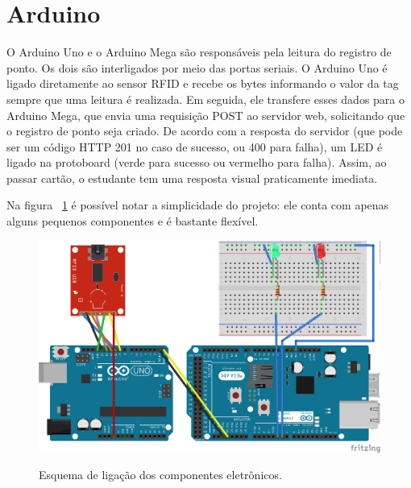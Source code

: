 \section{Arduino}

O Arduino Uno e o Arduino Mega são responsáveis pela leitura do registro de ponto. Os dois são interligados por meio das portas seriais. O Arduino Uno é ligado diretamente ao sensor RFID e recebe os bytes informando o valor da tag sempre que uma leitura é realizada. Em seguida, ele transfere esses dados para o Arduino Mega, que envia uma requisição POST ao servidor web, solicitando que o registro de ponto seja criado. De acordo com a resposta do servidor (que pode ser um código HTTP 201 no caso de sucesso, ou 400 para falha), um LED é ligado na protoboard (verde para sucesso ou vermelho para falha). Assim, ao passar cartão, o estudante tem uma resposta visual praticamente imediata. 

Na figura ~\ref{arduino_esquema} é possível notar a simplicidade do projeto: ele conta com apenas alguns pequenos componentes e é bastante flexível. 

\begin{figure}[H]
	\centering
	\caption{Esquema de ligação dos componentes eletrônicos.}
	\includegraphics[scale=0.8]{imagens/arduino_esquema.png}
	\label{arduino_esquema}
\end{figure}